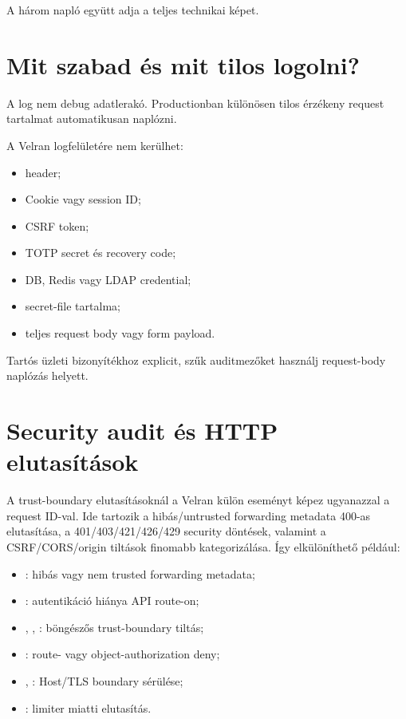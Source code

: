 A három napló együtt adja a teljes technikai képet.

\section{Mit szabad és mit tilos logolni?}

A log nem debug adatlerakó. Productionban különösen tilos érzékeny request tartalmat automatikusan naplózni.

A Velran logfelületére nem kerülhet:

\begin{itemize}
  \item {} header;
  \item Cookie vagy session ID;
  \item CSRF token;
  \item TOTP secret és recovery code;
  \item DB, Redis vagy LDAP credential;
  \item secret-file tartalma;
  \item teljes request body vagy form payload.
\end{itemize}

Tartós üzleti bizonyítékhoz explicit, szűk auditmezőket használj request-body naplózás helyett.

\section{Security audit és HTTP elutasítások}

A trust-boundary elutasításoknál a Velran külön  eseményt képez ugyanazzal a request ID-val. Ide tartozik a hibás/untrusted forwarding metadata 400-as elutasítása, a 401/403/421/426/429 security döntések, valamint a CSRF/CORS/origin tiltások finomabb kategorizálása. Így elkülöníthető például:

\begin{itemize}
  \item {}: hibás vagy nem trusted forwarding metadata;
  \item {}: autentikáció hiánya API route-on;
  \item {}, , : böngészős trust-boundary tiltás;
  \item {}: route- vagy object-authorization deny;
  \item {}, : Host/TLS boundary sérülése;
  \item {}: limiter miatti elutasítás.
\end{itemize}

